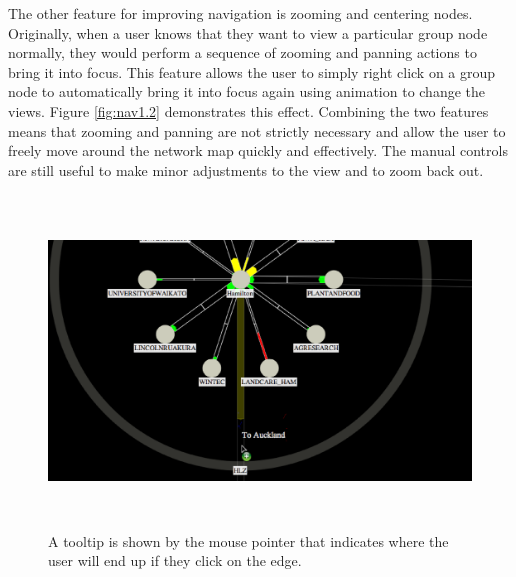 \documentclass[11pt, a4paper]{article}
\begin{document}
The other feature for improving navigation is zooming and centering nodes.
Originally, when a user knows that they want to view a particular group node
normally, they would perform a sequence of zooming and panning actions to bring
it into focus. This feature allows the user to simply right click on a group
node to automatically bring it into focus again using animation to change the
views. Figure \ref{fig:nav1.2} demonstrates this effect. Combining the two
features means that zooming and panning are not strictly necessary and allow the
user to freely move around the network map quickly and effectively. The manual
controls are still useful to make minor adjustments to the view and to zoom back
out.

\begin{figure}[h]
\centering
\includegraphics[width=170mm,height=88.01mm]{assets/nav1-1.eps}
\caption{A tooltip is shown by the mouse pointer that indicates where the user
will end up if they click on the edge.}
\label{fig:nav1.1}
\end{figure}
\end{document}
